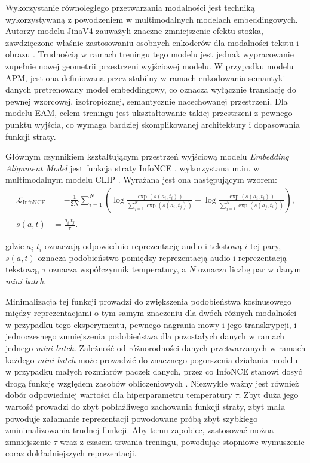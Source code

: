 Wykorzystanie równoległego przetwarzania modalności jest techniką wykorzystywaną z powodzeniem w multimodalnych modelach embeddingowych. Autorzy modelu JinaV4 zauważyli znaczne zmniejszenie efektu stożka, zawdzięczone właśnie zastosowaniu osobnych enkoderów dla modalności tekstu i obrazu \cite{jina_v4}. Trudnością w ramach treningu tego modelu jest jednak wypracowanie zupełnie nowej geometrii przestrzeni wyjściowej modelu. W przypadku modelu APM, jest ona definiowana przez stabilny w ramach enkodowania semantyki danych pretrenowany model embeddingowy, co oznacza wyłącznie translację do pewnej wzorcowej, izotropicznej, semantycznie nacechowanej przestrzeni. Dla modelu EAM, celem treningu jest ukształtowanie takiej przestrzeni z pewnego punktu wyjścia, co wymaga bardziej skomplikowanej architektury i dopasowania funkcji straty.

Głównym czynnikiem kształtującym przestrzeń wyjściową modelu \textit{Embedding Alignment Model} jest funkcja straty InfoNCE \cite{oord2018cpc}, wykorzystana m.in. w multimodalnym modelu CLIP \cite{radford2021learning}. Wyrażana jest ona następującym wzorem:
\begin{equation}
\begin{aligned}
\mathcal{L}_{\mathrm{InfoNCE}}
&= -\frac{1}{2N} \sum_{i=1}^{N}
\left(
    \log
    \frac{\exp(s(a_i, t_i))}
         {\sum_{j=1}^{N}\exp(s(a_i, t_j))}
    +
    \log
    \frac{\exp(s(a_i, t_i))}
         {\sum_{j=1}^{N}\exp(s(a_j, t_i))}
\right), \\
s(a,t)
&= \frac{a_i^\mathsf{T}t_j}{\tau}.
\end{aligned}
\label{eq:infoNCE}
\end{equation}

gdzie $a_i$ $t_i$ oznaczają odpowiednio reprezentację audio i tekstową $i$-tej pary, $s(a, t)$ oznacza podobieństwo pomiędzy reprezentacją audio i reprezentacją tekstową, $\tau$ oznacza współczynnik temperatury, a $N$ oznacza liczbę par w danym \textit{mini batch}.

Minimalizacja tej funkcji prowadzi do zwiększenia podobieństwa kosinusowego między reprezentacjami o tym samym znaczeniu dla dwóch różnych modalności -- w przypadku tego eksperymentu, pewnego nagrania mowy i jego transkrypcji, i jednoczesnego zmniejszenia podobieństwa dla pozostałych danych w ramach jednego \textit{mini batch}. Zależność od różnorodności danych przetwarzanych w ramach każdego \textit{mini batch} może prowadzić do znacznego pogorszenia działania modelu w przypadku małych rozmiarów paczek danych, przez co InfoNCE stanowi dosyć drogą funkcję względem zasobów obliczeniowych \cite{chen2021flatnce}. Niezwykle ważny jest również dobór odpowiedniej wartości dla hiperparametru temperatury $\tau$. Zbyt duża jego wartość prowadzi do zbyt pobłażliwego zachowania funkcji straty, zbyt mała powoduje załamanie reprezentacji powodowane próbą zbyt szybkiego zminimalizowania trudnej funkcji. Aby temu zapobiec, zastosować można zmniejszenie $\tau$ wraz z czasem trwania treningu, powodując stopniowe wymuszenie coraz dokładniejszych reprezentacji.

